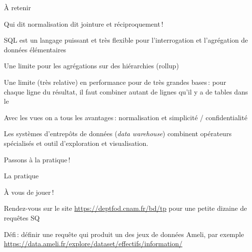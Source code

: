 
\begin{frame}{À retenir}


\begin{redbullet}
 \item \alert{Qui dit normalisation dit jointure et réciproquement\,!}
  \item SQL est un langage puissant et très flexible pour l'interrogation et l'agrégation 
      de données élémentaires
 \item Une limite pour les agrégations sur des hiérarchies (rollup) 
  \item Une limite (très relative) en performance pour de très grandes bases\,: 
  pour chaque ligne du résultat,  il faut combiner autant de lignes qu'il y a de tables dans le 
 
  \item Avec les vues on a tous les avantages\,: normalisation \alert{et}
   simplicité / confidentialité
\end{redbullet}

\vfill

Les systèmes d'entrepôts de données (\textit{data warehouse}) 
combinent opérateurs spécialisés et outil d'exploration et visualisation.

\vfill
Passons à la pratique\,!

\end{frame}


\begin{frame}{La pratique}

À vous de jouer\,!

\vfill


Rendez-vous sur le site \url{https://deptfod.cnam.fr/bd/tp} pour une petite dizaine
de requêtes SQ

\vfill

\alert{Défi}\,: définir une requête qui produit un des jeux de données Ameli, par
exemple \url{https://data.ameli.fr/explore/dataset/effectifs/information/}

\end{frame}